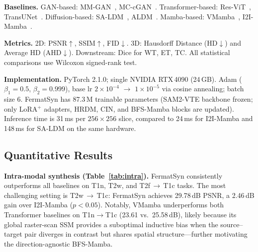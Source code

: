 \documentclass[runningheads]{llncs}
\begin{document}
\noindent\textbf{Baselines.}
GAN-based: MM-GAN~\cite{sharma2019missing},
MC-cGAN~\cite{dar2019image}.
Transformer-based: Res-ViT~\cite{Dalmaz2022ResViT},
TransUNet~\cite{chen2021transunet}.
Diffusion-based: SA-LDM~\cite{zhang2025structure},
ALDM~\cite{Kim_2024_WACV}.
Mamba-based: VMamba~\cite{Liu2024VMamba},
I2I-Mamba~\cite{xing2024i2imamba}.

\noindent\textbf{Metrics.}
2D: PSNR$\uparrow$, SSIM$\uparrow$, FID$\downarrow$.
3D: Hausdorff Distance (HD$\downarrow$) and Average HD (AHD$\downarrow$).
Downstream: Dice for WT, ET, TC.
All statistical comparisons use Wilcoxon signed-rank test.

\noindent\textbf{Implementation.}
PyTorch 2.1.0; single NVIDIA RTX\,4090 (24\,GB).
Adam ($\beta_1{=}0.5$, $\beta_2{=}0.999$), base lr $2{\times}10^{-4}$
$\to$ $1{\times}10^{-5}$ via cosine annealing; batch size 6.
FermatSyn has 87.3\,M trainable parameters (SAM2-VTE backbone frozen;
only LoRA$^{+}$ adapters, HRDM, CIN, and BFS-Mamba blocks are updated).
Inference time is 31\,ms per $256{\times}256$ slice, compared to
24\,ms for I2I-Mamba and 148\,ms for SA-LDM on the same hardware.

\subsection{Quantitative Results}

\noindent\textbf{Intra-modal synthesis (Table~\ref{tab:intra}).}
FermatSyn consistently outperforms all baselines on T1n, T2w,
and T2f\,$\to$\,T1c tasks.
The most challenging setting is T2w\,$\to$\,T1c: FermatSyn achieves
29.78\,dB PSNR, a 2.46\,dB gain over I2I-Mamba ($p{<}0.05$).
Notably, VMamba underperforms both Transformer baselines on
T1n$\to$T1c (23.61 vs.\ 25.58\,dB), likely because its global
raster-scan SSM provides a suboptimal inductive bias when the
source--target pair diverges in contrast but shares spatial
structure---further motivating the direction-agnostic BFS-Mamba.
\end{document}

